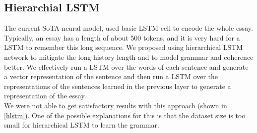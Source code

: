 \documentclass[11pt,a4paper]{article}
\newcommand{\acomment}[1]{{\bf{\color{blue}{{[Aman: #1]}}}}}
\begin{document}
  
  


\subsection{Hierarchial LSTM}

The current SoTA neural model, used basic LSTM cell to encode the whole essay. Typically, an essay has a length of about 500 tokens, and it is very hard for a LSTM to remember this long sequence. We proposed using hierarchical LSTM network to mitigate the long history length and to model grammar and coherence better. We effectively run a LSTM over the words of each sentence and generate a vector representation of the sentence and then run a LSTM over the representations of the sentences learned in the previous layer to generate a representation of the essay.\\ 
We were not able to get satisfactory results with this approach (shown in \cref{hlstm}). One of the possible explanations for this is that the dataset size is too small for hierarchical LSTM to learn the grammar.
\end{document}
